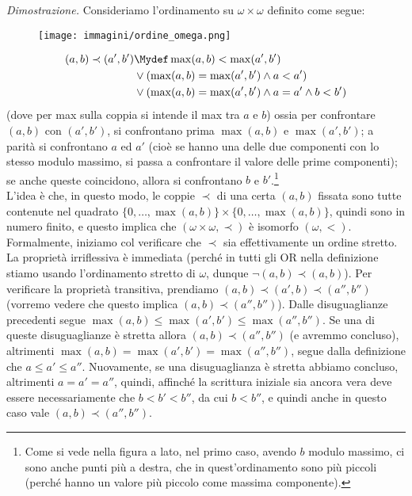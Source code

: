 \documentclass[11pt]{scrartcl}
\begin{document}
\emph{Dimostrazione.} Consideriamo l'ordinamento su $\omega \times \omega$ definito come segue:
	\begin{wrapfigure}[8]{l}{2.5cm}
		\texttt{[image: immagini/ordine\_omega.png]}
	\end{wrapfigure}
	\[ \begin{split}
		(a,b) \prec (a',b') &\Mydef \max(a,b) < \max(a',b') \\
							&\lor (\max(a,b) = \max(a',b') \land a < a') \\
							&\lor (\max(a,b) = \max(a',b') \land a = a' \land b < b')
	\end{split}
		\]
	(dove per max sulla coppia si intende il max tra $a$ e $b$) ossia per confrontare $(a,b)$ con $(a',b')$, si confrontano prima $\max(a,b)$ e $\max(a',b')$; a parità si confrontano $a$ ed $a'$ (cioè se hanno una delle due componenti con lo stesso modulo massimo, si passa a confrontare il valore delle prime componenti);
	se anche queste coincidono, allora si confrontano $b$ e $b'$.\footnote{Come si vede nella figura a lato, nel primo caso, avendo $b$ modulo massimo, ci sono anche punti più a destra, che in quest'ordinamento sono più piccoli (perché hanno un valore più piccolo come massima componente).}\\
	L'idea è che, in questo modo, le coppie $\prec$ di una certa $(a,b)$ fissata sono tutte contenute nel quadrato $\{0,\ldots,\max(a,b)\} \times \{0,\ldots,\max(a,b)\}$, quindi sono in numero finito, e questo 
	implica che $(\omega \times \omega, \prec)$ è isomorfo $(\omega,<)$.\\
	Formalmente, iniziamo col verificare che $\prec$ sia effettivamente un ordine stretto. La proprietà irriflessiva è immediata (perché in tutti gli OR nella definizione stiamo usando l'ordinamento stretto di $\omega$, dunque
	$\neg (a,b) \prec (a,b)$). Per verificare la proprietà transitiva, prendiamo $(a,b) \prec (a',b) \prec (a'',b'')$ (vorremo vedere che questo implica $(a,b) \prec (a'',b'')$). Dalle disuguaglianze precedenti segue $\max(a,b) \leq \max(a',b') \leq \max(a'',b'')$. Se una di queste disuguaglianze è stretta allora $(a,b) \prec (a'',b'')$ (e avremmo concluso),
	altrimenti $\max(a,b) = \max(a',b') = \max(a'',b'')$, segue dalla definizione che $a \leq a' \leq a''$.
	Nuovamente, se una disuguaglianza è stretta abbiamo concluso, altrimenti $a = a' = a''$, quindi, affinché la scrittura iniziale sia ancora vera deve essere necessariamente che $b < b' < b''$, da cui $b < b''$, e quindi anche in questo caso vale $(a,b) \prec (a'',b'')$.\\
\end{document}
